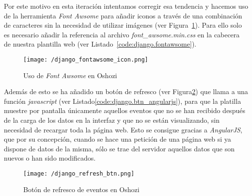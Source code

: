 Por este motivo en esta iteración intentamos corregir esa tendencia y hacemos uso de la herramienta \textit{Font Awsome} para añadir iconos a través de una combinación de caracteres sin la necesidad de utilizar imágenes (ver Figura~\ref{fig:django_fontawsome_icon}). Para ello solo es necesario añadir la referencia al archivo \textit{font\_awsome.min.css} en la cabecera de nuestra plantilla web (ver Listado~\ref{code:django.fontawsome}).

\begin{figure}[!h]
\centering
\texttt{[image: /django\_fontawsome\_icon.png]}
\caption{Uso de \textit{Font Awsome} en Oshozi}
\label{fig:django_fontawsome_icon}
\end{figure}



Además de esto se ha añadido un botón de refresco (ver Figura\ref{fig:django_refresh_btn}) que llama a una función \textit{javascript} (ver Listado\ref{code:django.btn_angularjs}), para que la platilla muestre por pantalla únicamente aquellos eventos que no se han recibido después de la carga de los datos en la interfaz y que no se están visualizando, sin necesidad de recargar toda la página web. Esto se consigue gracias a \textit{AngularJS}, que por su concepción, cuando se hace una petición de una página web si ya dispone de datos de la misma, sólo se trae del servidor aquellos datos que son nuevos o han sido modificados.

\begin{figure}[!h]
\centering
\texttt{[image: /django\_refresh\_btn.png]}
\caption{Botón de refresco de eventos en Oshozi}
\label{fig:django_refresh_btn}
\end{figure}



